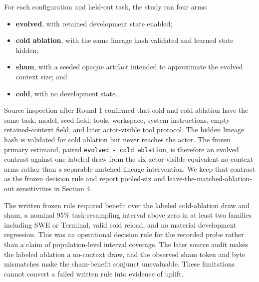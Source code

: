 \documentclass[10pt,twocolumn]{article}
\providecommand{\tightlist}{\setlength{\itemsep}{0pt}\setlength{\parskip}{0pt}}
\begin{document}
For each configuration and held-out task, the study ran four arms:

\begin{itemize}
\tightlist
\item
  \textbf{evolved}, with retained development state enabled;
\item
  \textbf{cold ablation}, with the same lineage hash validated and
  learned state hidden;
\item
  \textbf{sham}, with a seeded opaque artifact intended to approximate
  the evolved context size; and
\item
  \textbf{cold}, with no development state.
\end{itemize}

Source inspection after Round 1 confirmed that cold and cold ablation
have the same task, model, seed field, tools, workspace, system
instructions, empty retained-context field, and later actor-visible tool
protocol. The hidden lineage hash is validated for cold ablation but
never reaches the actor. The frozen primary estimand, paired
\texttt{evolved\ -\ cold\ ablation}, is therefore an evolved contrast
against one labeled draw from the six actor-visible-equivalent
no-context arms rather than a separable matched-lineage intervention. We
keep that contrast as the frozen decision rule and report pooled-six and
leave-the-matched-ablation-out sensitivities in Section 4.

The written frozen rule required benefit over the labeled cold-ablation
draw and sham, a nominal 95\% task-resampling interval above zero in at
least two families including SWE or Terminal, valid cold reload, and no
material development regression. This was an operational decision rule
for the recorded probe rather than a claim of population-level interval
coverage. The later source audit makes the labeled ablation a no-context
draw, and the observed sham token and byte mismatches make the
sham-benefit conjunct unevaluable. These limitations cannot convert a
failed written rule into evidence of uplift.
\end{document}
